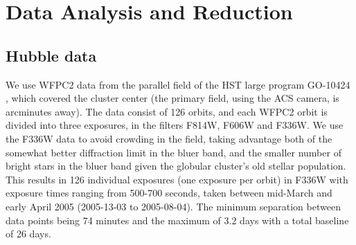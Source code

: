 \documentclass[fleqn,usenatbib,useAMS,letters]{mnras}
\begin{document}
\section{Data Analysis and Reduction}

\subsection{Hubble data}

We use WFPC2 data from the parallel field of the HST large program %
GO-10424 \citep{2006Sci...313..936R}, which covered the cluster center (the primary field, using the ACS camera, is arcminutes away). The data consist of 126 orbits, and each WFPC2 orbit is divided into three exposures, in the filters F814W, F606W and F336W.
We use the F336W data to avoid crowding in the field, taking advantage both of the somewhat better diffraction limit in the bluer band, and the smaller number of bright stars in the bluer band given the globular cluster's old stellar population. This results in 126 individual exposures (one exposure per orbit) in F336W with exposure times ranging from 500-700 seconds, taken between mid-March and early April 2005 (2005-13-03 to 2005-08-04). The minimum separation between data points being 74 minutes and the maximum of 3.2 days with a total baseline of 26 days.
\end{document}
